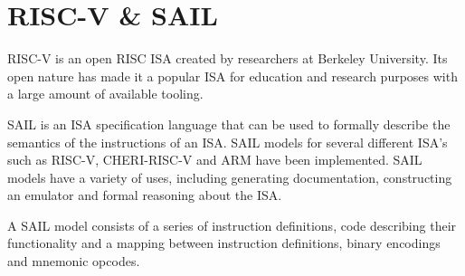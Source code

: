 \section{RISC-V \& SAIL}
RISC-V is an open RISC ISA created by researchers at Berkeley University. Its open nature has made it a popular ISA for education and research purposes with a large amount of available tooling.

SAIL is an ISA specification language that can be used to formally describe the semantics of the instructions of an ISA. SAIL models for several different ISA's such as RISC-V, CHERI-RISC-V and ARM have been implemented. SAIL models have a variety of uses, including generating documentation, constructing an emulator and formal reasoning about the ISA.

A SAIL model consists of a series of instruction definitions, code describing their functionality and a mapping between instruction definitions, binary encodings and mnemonic opcodes.

